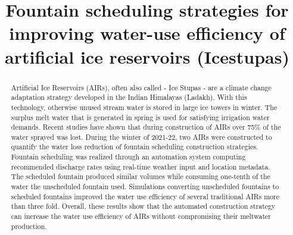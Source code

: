 \documentclass[tc, manuscript]{copernicus}
\begin{document}
\title{Fountain scheduling strategies for improving water-use efficiency of artificial ice reservoirs (Icestupas)}

\def\Authors{Suryanarayanan Balasubramanian\,$^{1,2}$, Martin Hoelzle\,$^{1}$Roger Waser\,$^{3}$}

\def\Address{$^{1}$University of Fribourg, Department of Geosciences, Fribourg, Switzerland $^{2}$University of
Applied Sciences and Arts, Luzern, Switzerland} \def\corrAuthor{Suryanarayanan Balasubramanian}





\maketitle

\begin{abstract}

  Artificial Ice Reservoirs (AIRs), often also called - Ice Stupas - are a climate change adaptation strategy
  developed in the Indian Himalayas (Ladakh). With this technology, otherwise unused stream water is stored in
  large ice towers in winter. The surplus melt water that is generated in spring is used for satisfying
  irrigation water demands. Recent studies have shown that during construction of AIRs over 75\% of the water
  sprayed was lost. During the winter of 2021-22, two AIRs were constructed to quantify the water loss reduction
  of fountain scheduling construction strategies. Fountain scheduling was realized through an automation system
  computing recommended discharge rates using real-time weather input and location metadata. The scheduled
  fountain produced similar volumes while consuming one-tenth of the water the unscheduled fountain used.
  Simulations converting unscheduled fountains to scheduled fountains improved the water use efficiency of
  several traditional AIRs more than three fold. Overall, these results show that the automated construction
  strategy can increase the water use efficiency of AIRs without compromising their meltwater production.

\end{abstract}
\end{document}
